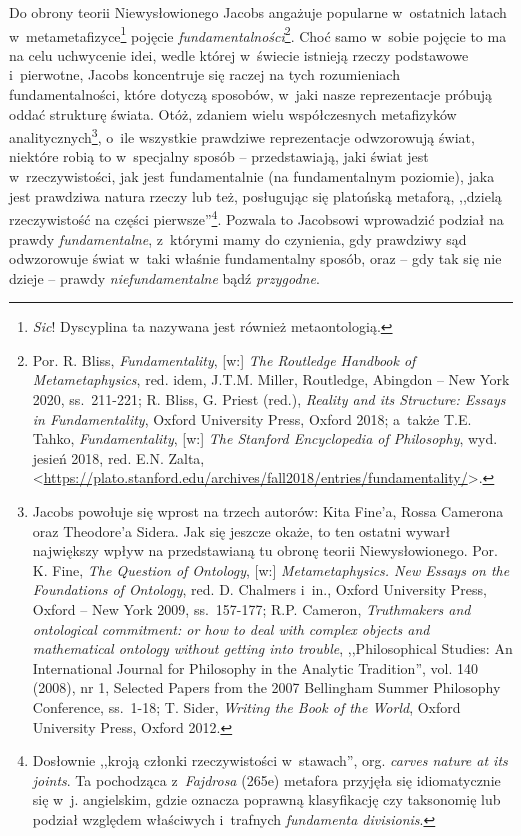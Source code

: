 Do obrony teorii Niewysłowionego Jacobs angażuje popularne w~ostatnich latach w~metametafizyce\footnote{\textit{Sic}! Dyscyplina ta nazywana jest również metaontologią.} pojęcie \textit{fundamentalności}\footnote{Por. R. Bliss, \textit{Fundamentality}, [w:] \textit{The Routledge Handbook of Metametaphysics}, red. idem, J.T.M. Miller, Routledge, Abingdon -- New York 2020, ss.~211-221; R. Bliss, G. Priest (red.), \textit{Reality and its Structure: Essays in Fundamentality}, Oxford University Press, Oxford 2018; a~także T.E. Tahko, \textit{Fundamentality}, [w:] \textit{The Stanford Encyclopedia of Philosophy}, wyd. jesień 2018, red. E.N. Zalta, {\textless}\url{https://plato.stanford.edu/archives/fall2018/entries/fundamentality/}{\textgreater}.}.
Choć samo w~sobie pojęcie to ma na celu uchwycenie idei, wedle której w~świecie istnieją rzeczy podstawowe i~pierwotne, Jacobs koncentruje się raczej na tych rozumieniach fundamentalności, które dotyczą sposobów, w~jaki nasze reprezentacje próbują oddać strukturę świata. Otóż, zdaniem wielu współczesnych metafizyków analitycznych\footnote{Jacobs powołuje się wprost na trzech autorów: Kita Fine'a, Rossa Camerona oraz Theodore'a Sidera. Jak się jeszcze okaże, to ten ostatni wywarł największy wpływ na przedstawianą tu obronę teorii Niewysłowionego. Por. K. Fine, \textit{The Question of Ontology}, [w:] \textit{Metametaphysics. New Essays on the Foundations of Ontology}, red. D. Chalmers i~in., Oxford University Press, Oxford -- New York 2009, ss.~157-177; R.P. Cameron, \textit{Truthmakers and ontological commitment: or how to deal with complex objects and mathematical ontology without getting into trouble}, ,,Philosophical Studies: An International Journal for Philosophy in the Analytic Tradition'', vol. 140 (2008), nr 1, Selected Papers from the 2007 Bellingham Summer Philosophy Conference, ss.~1-18; T. Sider, \textit{Writing the Book of the World}, Oxford University Press, Oxford 2012.}, o~ile wszystkie prawdziwe reprezentacje odwzorowują świat, niektóre robią to w~specjalny sposób -- przedstawiają, jaki świat jest w~rzeczywistości, jak jest fundamentalnie (na fundamentalnym poziomie), jaka jest prawdziwa natura rzeczy lub też, posługując się platońską metaforą, ,,dzielą rzeczywistość na części pierwsze''\footnote{Dosłownie ,,kroją członki rzeczywistości w~stawach'', org. \textit{carves nature at its joints}. Ta pochodząca z~\textit{Fajdrosa} (265e) metafora przyjęła się idiomatycznie się w~j. angielskim, gdzie oznacza poprawną klasyfikację czy taksonomię lub podział względem właściwych i~trafnych \textit{fundamenta divisionis}.}. Pozwala to Jacobsowi wprowadzić podział na prawdy \textit{fundamentalne}, z~którymi mamy do czynienia, gdy prawdziwy sąd odwzorowuje świat w~taki właśnie fundamentalny sposób, oraz -- gdy tak się nie dzieje -- prawdy \textit{niefundamentalne} bądź \textit{przygodne}.

